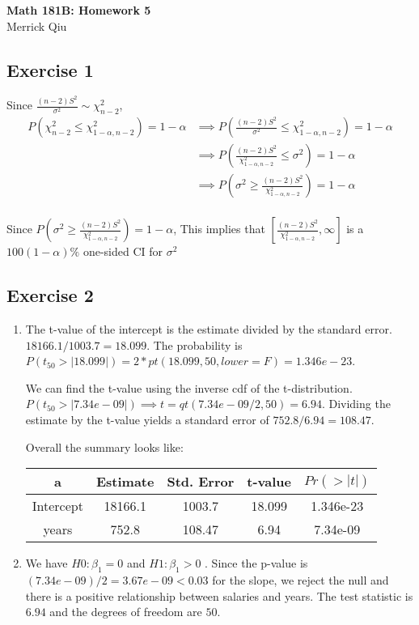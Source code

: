 \documentclass{article}
\begin{document}
\begin{center}
	\huge{\bf Math 181B: Homework 5} \\
	Merrick Qiu 
\end{center}
\subsection*{Exercise 1}
Since $\frac{(n-2)S^2}{\sigma^2} \sim \chi_{n-2}^2$,
\begin{align*}
	P\left(\chi_{n-2}^2 \leq \chi_{1-\alpha, n-2}^2\right) = 1 - \alpha
	&\implies P\left(\frac{(n-2)S^2}{\sigma^2} \leq \chi_{1-\alpha, n-2}^2\right) = 1 - \alpha \\
	&\implies P\left(\frac{(n-2)S^2}{\chi_{1-\alpha, n-2}^2} \leq \sigma^2 \right) = 1 - \alpha \\
	&\implies P\left(\sigma^2 \geq \frac{(n-2)S^2}{\chi_{1-\alpha, n-2}^2}\right) = 1 - \alpha \\
\end{align*}

Since $P\left(\sigma^2 \geq \frac{(n-2)S^2}{\chi_{1-\alpha, n-2}^2}\right) = 1 - \alpha$,
This implies that $\left[\frac{(n-2)S^2}{\chi_{1-\alpha, n-2}^2}, \infty \right]$
is a $100(1-\alpha)\%$ one-sided CI for $\sigma^2$
\newpage 

\subsection*{Exercise 2}
\begin{enumerate}
	\item The t-value of the intercept is the estimate divided by the standard error.
	$18166.1/1003.7=18.099$. The probability is $P(t_{50}>|18.099|) = 2*pt(18.099, 50, lower=F) =1.346e-23$.

	We can find the t-value using the inverse cdf of the t-distribution.
	$P(t_{50}>|7.34e-09|) \implies t = qt(7.34e-09/2, 50) = 6.94$.
	Dividing the estimate by the t-value yields a standard error of 
	$752.8/6.94=108.47$.

	Overall the summary looks like:
	\begin{center}
		\begin{tabular}{c | c c c c}
			\hline
			a & Estimate & Std. Error & t-value & $Pr(>|t|)$ \\
			\hline 
			Intercept & 18166.1 & 1003.7 & 18.099 & 1.346e-23 \\ 
		 	years & 752.8 & 108.47 & 6.94 & 7.34e-09 \\
			\hline
		\end{tabular}
	\end{center}

	\item We have  $H0: \beta_1 = 0$ and $H1: \beta_1 > 0$ .
	Since the p-value is $(7.34e-09)/2 = 3.67e-09 < 0.03$ for the slope,
	we reject the null and there is a positive relationship between salaries and years. 
	The test statistic is $6.94$ and the degrees of freedom are $50$.
\end{enumerate}
\newpage
\end{document}
